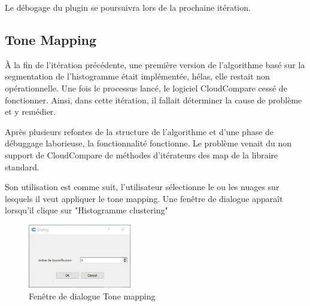 \documentclass[12pt,titlepage,french]{article}
\begin{document}
Le débogage du plugin se poursuivra lors de la prochaine itération.

\subsection{Tone Mapping}

À la fin de l'itération précédente, une première version de l'algorithme basé sur la segmentation de l'histogramme était implémentée, hélas, elle restait non opérationnelle. Une fois le processus lancé, le logiciel CloudCompare cessé de fonctionner. Ainsi, dans cette itération, il fallait déterminer la cause de problème et y remédier.

Après plusieurs refontes de la structure de l'algorithme et d'une phase de débuggage laborieuse, la fonctionnalité fonctionne. Le problème venait du non support de CloudCompare de méthodes d'itérateurs des map de la libraire standard.

Son utilisation est comme suit, l'utilisateur sélectionne le ou les nuages sur lesquels il veut appliquer le tone mapping. Une fenêtre de dialogue apparaît lorsqu'il clique sur "Histogramme clustering"

\begin{figure}[H]
 \caption{\label{} Fenêtre de dialogue Tone mapping}
 \begin{center}
 \includegraphics[width=0.4\textwidth]{./img/ToonMappingDialog.PNG}
  \end{center}
\end{figure}
\end{document}
